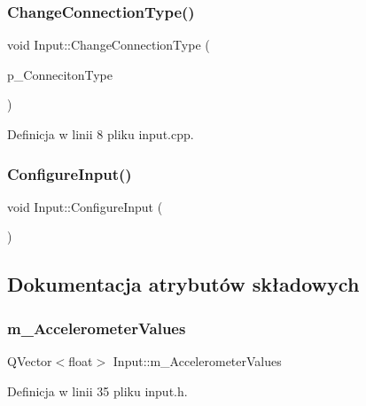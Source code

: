 \subsubsection{\texorpdfstring{Change\+Connection\+Type()}{ChangeConnectionType()}}
{\footnotesize\ttfamily void Input\+::\+Change\+Connection\+Type (\begin{DoxyParamCaption}\item[{\hyperlink{class_input_a3be20be9b454515798ecd3370f4e36fd}{Input\+::\+Connection\+Type\+\_\+t}}]{p\+\_\+\+Conneciton\+Type }\end{DoxyParamCaption})}



Definicja w linii 8 pliku input.\+cpp.

\mbox{\label{class_input_a7f95fd4a76826d4a28b25e32e6c7244c}} 
\subsubsection{\texorpdfstring{Configure\+Input()}{ConfigureInput()}}
{\footnotesize\ttfamily void Input\+::\+Configure\+Input (\begin{DoxyParamCaption}{ }\end{DoxyParamCaption})}



\subsection{Dokumentacja atrybutów składowych}
\mbox{\label{class_input_ab2572d4f32d4a82f4023277b24a4b0a4}} 
\subsubsection{\texorpdfstring{m\+\_\+\+Accelerometer\+Values}{m\_AccelerometerValues}}
{\footnotesize\ttfamily Q\+Vector$<$float$>$ Input\+::m\+\_\+\+Accelerometer\+Values\hspace{0.3cm}{\ttfamily [private]}}



Definicja w linii 35 pliku input.\+h.

\mbox{\label{class_input_aeccfe44263c5985405f94c5feb0ed0aa}} 
